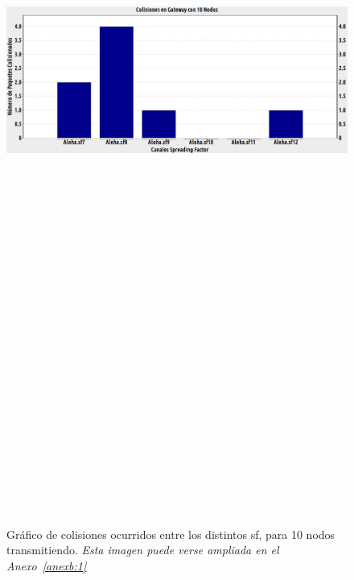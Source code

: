 \begin{justify}
\begin{figure}[!ht]
\centering
\includegraphics[width=13cm,height=30cm,keepaspectratio]{images/colisiones10nodos.eps}
\caption{Gráfico de colisiones ocurridos entre los distintos \gls{sf}, para 10 nodos transmitiendo. \textit{Esta imagen puede verse ampliada en el Anexo~\ref{anexb:1}}}
\label{nodos:10}
\end{figure}


\end{justify}
